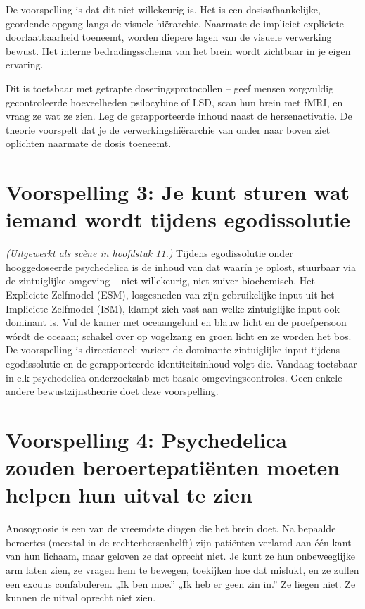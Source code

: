 \documentclass[11pt, twoside, openright]{book}
\begin{document}
De voorspelling is dat dit niet willekeurig is. Het is een dosisafhankelijke, geordende opgang langs de visuele hiërarchie. Naarmate de impliciet-expliciete doorlaatbaarheid toeneemt, worden diepere lagen van de visuele verwerking bewust. Het interne bedradingsschema van het brein wordt zichtbaar in je eigen ervaring.

Dit is toetsbaar met getrapte doseringsprotocollen -- geef mensen zorgvuldig gecontroleerde hoeveelheden psilocybine of LSD, scan hun brein met fMRI, en vraag ze wat ze zien. Leg de gerapporteerde inhoud naast de hersenactivatie. De theorie voorspelt dat je de verwerkingshiërarchie van onder naar boven ziet oplichten naarmate de dosis toeneemt.

\section*{Voorspelling 3: Je kunt sturen wat iemand wordt tijdens egodissolutie}

\textit{(Uitgewerkt als scène in hoofdstuk 11.)} Tijdens egodissolutie onder hooggedoseerde psychedelica is de inhoud van dat waarín je oplost, stuurbaar via de zintuiglijke omgeving -- niet willekeurig, niet zuiver biochemisch. Het Expliciete Zelfmodel (ESM), losgesneden van zijn gebruikelijke input uit het Impliciete Zelfmodel (ISM), klampt zich vast aan welke zintuiglijke input ook dominant is. Vul de kamer met oceaangeluid en blauw licht en de proefpersoon wórdt de oceaan; schakel over op vogelzang en groen licht en ze worden het bos. De voorspelling is directioneel: varieer de dominante zintuiglijke input tijdens egodissolutie en de gerapporteerde identiteitsinhoud volgt die. Vandaag toetsbaar in elk psychedelica-onderzoekslab met basale omgevingscontroles. Geen enkele andere bewustzijnstheorie doet deze voorspelling.

\section*{Voorspelling 4: Psychedelica zouden beroertepatiënten moeten helpen hun uitval te zien}

Anosognosie is een van de vreemdste dingen die het brein doet. Na bepaalde beroertes (meestal in de rechterhersenhelft) zijn patiënten verlamd aan één kant van hun lichaam, maar geloven ze dat oprecht niet. Je kunt ze hun onbeweeglijke arm laten zien, ze vragen hem te bewegen, toekijken hoe dat mislukt, en ze zullen een excuus confabuleren. „Ik ben moe.” „Ik heb er geen zin in.” Ze liegen niet. Ze kunnen de uitval oprecht niet zien.
\end{document}
